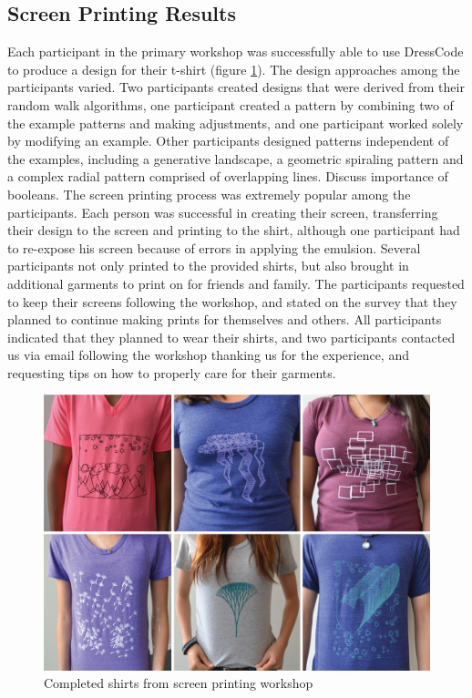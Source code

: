 \documentclass{sigchi}
\begin{document}
\subsection{Screen Printing Results}
Each participant in the primary workshop was successfully able to use DressCode to produce a design for their t-shirt (figure \ref{fig:screen_results}). The design approaches among the participants varied. Two participants created designs that were derived from their random walk algorithms, one participant created a pattern by combining two of the example patterns and making adjustments, and one participant worked solely by modifying an example. Other participants designed patterns independent of the examples, including a generative landscape, a geometric spiraling pattern and a complex radial pattern comprised of overlapping lines. Discuss importance of booleans. The screen printing process was extremely popular among the participants. Each person was successful in creating their screen, transferring their design to the screen and printing to the shirt, although one participant had to re-expose his screen because of errors in applying the emulsion. Several participants not only printed to the provided shirts, but also brought in additional garments to print on for friends and family. The participants requested to keep their screens following the workshop, and stated on the survey that they planned to continue making prints for themselves and others. All participants indicated that they planned to wear their shirts, and two participants contacted us via email following the workshop thanking us for the experience, and requesting tips on how to properly care for their garments. 

\begin{center}
\begin{figure}[h!]
\includegraphics[width=\columnwidth]{images/shirt_results.jpg}
\caption{Completed shirts from screen printing workshop}
\label{fig:screen_results}
\end{figure}
\end{center}
\end{document}

